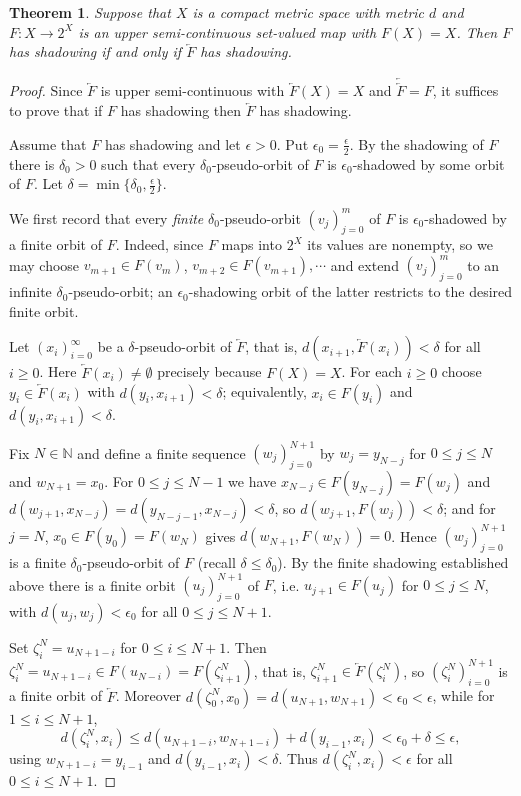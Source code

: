\documentclass[12pt]{amsart}
\newtheorem{theorem}{Theorem}[section]
\theoremstyle{definition}
\begin{document}
\begin{theorem}\label{thm:equiv}
	Suppose that $X$ is a compact metric space with metric $d$ and $F:X\rightarrow 2^X$ is an upper semi-continuous set-valued map with $F(X)=X$. Then $F$ has shadowing if and only if $\underleftarrow{F}$ has shadowing.
\end{theorem}
\begin{proof}
	Since $\underleftarrow{F}$ is upper semi-continuous with $\underleftarrow{F}(X)=X$ and $\underleftarrow{\underleftarrow{F}}=F$, it suffices to prove that if $F$ has shadowing then $\underleftarrow{F}$ has shadowing.
	
	Assume that $F$ has shadowing and let $\epsilon>0$. Put $\epsilon_0=\frac{\epsilon}{2}$. By the shadowing of $F$ there is $\delta_0>0$ such that every $\delta_0$-pseudo-orbit of $F$ is $\epsilon_0$-shadowed by some orbit of $F$. Let $\delta=\min\{\delta_0,\frac{\epsilon}{2}\}$.
	
	We first record that every \emph{finite} $\delta_0$-pseudo-orbit $(v_j)_{j=0}^{m}$ of $F$ is $\epsilon_0$-shadowed by a finite orbit of $F$. Indeed, since $F$ maps into $2^X$ its values are nonempty, so we may choose $v_{m+1}\in F(v_m)$, $v_{m+2}\in F(v_{m+1}),\cdots$ and extend $(v_j)_{j=0}^{m}$ to an infinite $\delta_0$-pseudo-orbit; an $\epsilon_0$-shadowing orbit of the latter restricts to the desired finite orbit.
	
	Let $(x_i)_{i=0}^\infty$ be a $\delta$-pseudo-orbit of $\underleftarrow{F}$, that is, $d(x_{i+1},\underleftarrow{F}(x_i))<\delta$ for all $i\geq0$. Here $\underleftarrow{F}(x_i)\neq\emptyset$ precisely because $F(X)=X$. For each $i\geq0$ choose $y_i\in\underleftarrow{F}(x_i)$ with $d(y_i,x_{i+1})<\delta$; equivalently, $x_i\in F(y_i)$ and $d(y_i,x_{i+1})<\delta$.
	
	Fix $N\in\mathbb{N}$ and define a finite sequence $(w_j)_{j=0}^{N+1}$ by $w_j=y_{N-j}$ for $0\leq j\leq N$ and $w_{N+1}=x_0$. For $0\leq j\leq N-1$ we have $x_{N-j}\in F(y_{N-j})=F(w_j)$ and $d(w_{j+1},x_{N-j})=d(y_{N-j-1},x_{N-j})<\delta$, so $d(w_{j+1},F(w_j))<\delta$; and for $j=N$, $x_0\in F(y_0)=F(w_N)$ gives $d(w_{N+1},F(w_N))=0$. Hence $(w_j)_{j=0}^{N+1}$ is a finite $\delta_0$-pseudo-orbit of $F$ (recall $\delta\leq\delta_0$). By the finite shadowing established above there is a finite orbit $(u_j)_{j=0}^{N+1}$ of $F$, i.e. $u_{j+1}\in F(u_j)$ for $0\leq j\leq N$, with $d(u_j,w_j)<\epsilon_0$ for all $0\leq j\leq N+1$.
	
	Set $\zeta_i^N=u_{N+1-i}$ for $0\leq i\leq N+1$. Then $\zeta_i^N=u_{N+1-i}\in F(u_{N-i})=F(\zeta_{i+1}^N)$, that is, $\zeta_{i+1}^N\in\underleftarrow{F}(\zeta_i^N)$, so $(\zeta_i^N)_{i=0}^{N+1}$ is a finite orbit of $\underleftarrow{F}$. Moreover $d(\zeta_0^N,x_0)=d(u_{N+1},w_{N+1})<\epsilon_0<\epsilon$, while for $1\leq i\leq N+1$,
	$$d(\zeta_i^N,x_i)\leq d(u_{N+1-i},w_{N+1-i})+d(y_{i-1},x_i)<\epsilon_0+\delta\leq\epsilon,$$
	using $w_{N+1-i}=y_{i-1}$ and $d(y_{i-1},x_i)<\delta$. Thus $d(\zeta_i^N,x_i)<\epsilon$ for all $0\leq i\leq N+1$.
	

\end{proof}
\end{document}
